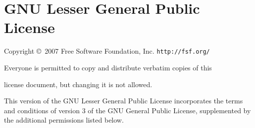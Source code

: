 \renewcommand{\labelenumii}{\alph{enumii})}
\renewcommand{\labelenumiii}{\arabic{enumiii})}

\chapter{GNU Lesser General Public License}\label{app:lgpl}


\begin{center}
{\parindent 0in

Copyright \copyright\  2007 Free Software Foundation, Inc. \texttt{http://fsf.org/}

\bigskip
Everyone is permitted to copy and distribute verbatim copies of this

license document, but changing it is not allowed.}

\end{center}


  This version of the GNU Lesser General Public License incorporates
the terms and conditions of version 3 of the GNU General Public
License, supplemented by the additional permissions listed below.

